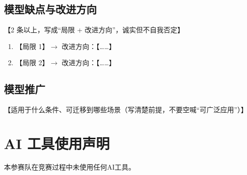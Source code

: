 \documentclass[12pt,a4paper,fontset=windows]{ctexart}
\begin{document}
\subsection{模型缺点与改进方向}
【2 条以上，写成“局限 + 改进方向”，诚实但不自我否定】
\begin{enumerate}
  \item 【局限 1】$\rightarrow$ 改进方向：【……】
  \item 【局限 2】$\rightarrow$ 改进方向：【……】
\end{enumerate}

\subsection{模型推广}
【适用于什么条件、可迁移到哪些场景（写清楚前提，不要空喊“可广泛应用”）】

\section*{AI 工具使用声明}

本参赛队在竞赛过程中未使用任何AI工具。

\end{document}

